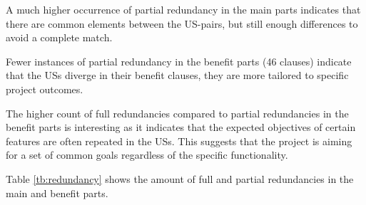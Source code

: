 A much higher occurrence of partial redundancy in the main parts indicates that there are common elements between the US-pairs, but still enough differences to avoid a complete match. 

Fewer instances of partial redundancy in the benefit parts (46 clauses) indicate that the USs diverge in their benefit clauses, they are more tailored to specific project outcomes. 

The higher count of full redundancies compared to partial redundancies in the benefit parts is interesting as it indicates that the expected objectives of certain features are often repeated in the USs. This suggests that the project is aiming for a set of common goals regardless of the specific functionality.

Table \ref{tb:redundancy} shows the amount of full and partial redundancies in the main and benefit parts.

